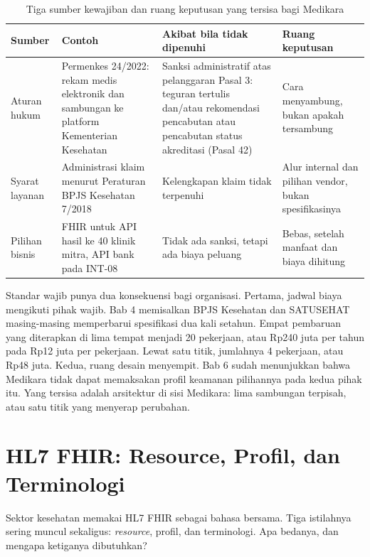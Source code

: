 \begin{table}[!htb]
  \centering
  \caption{Tiga sumber kewajiban dan ruang keputusan yang tersisa bagi Medikara}
  \label{tab:ch07-sumber-kewajiban}
  \footnotesize
  \begin{tabularx}{\textwidth}{B{2.0cm}AAA}
    \hline
    \textbf{Sumber} & \textbf{Contoh} & \textbf{Akibat bila tidak dipenuhi} & \textbf{Ruang keputusan} \\ \hline
    Aturan hukum & Permenkes 24/2022: rekam medis elektronik dan sambungan ke platform Kementerian Kesehatan & Sanksi administratif atas pelanggaran Pasal 3: teguran tertulis dan/atau rekomendasi pencabutan atau pencabutan status akreditasi (Pasal 42) & Cara menyambung, bukan apakah tersambung \\ \hline
    Syarat layanan & Administrasi klaim menurut Peraturan BPJS Kesehatan 7/2018 & Kelengkapan klaim tidak terpenuhi & Alur internal dan pilihan vendor, bukan spesifikasinya \\ \hline
    Pilihan bisnis & FHIR untuk API hasil ke 40 klinik mitra, API bank pada INT-08 & Tidak ada sanksi, tetapi ada biaya peluang & Bebas, setelah manfaat dan biaya dihitung \\ \hline
  \end{tabularx}
\end{table}

Standar wajib punya dua konsekuensi bagi organisasi. Pertama, jadwal biaya mengikuti pihak wajib. Bab 4 memisalkan
BPJS Kesehatan dan SATUSEHAT masing-masing memperbarui spesifikasi dua kali setahun. Empat pembaruan yang diterapkan
di lima tempat menjadi 20 pekerjaan, atau Rp240 juta per tahun pada Rp12 juta per pekerjaan. Lewat satu titik,
jumlahnya 4 pekerjaan, atau Rp48 juta. Kedua, ruang desain menyempit. Bab 6 sudah menunjukkan bahwa Medikara tidak
dapat memaksakan profil keamanan pilihannya pada kedua pihak itu. Yang tersisa adalah arsitektur di sisi Medikara:
lima sambungan terpisah, atau satu titik yang menyerap perubahan.

\section{HL7 FHIR: Resource, Profil, dan Terminologi}

Sektor kesehatan memakai HL7 FHIR sebagai bahasa bersama. Tiga istilahnya sering muncul sekaligus: \textit{resource},
profil, dan terminologi. Apa bedanya, dan mengapa ketiganya dibutuhkan?


